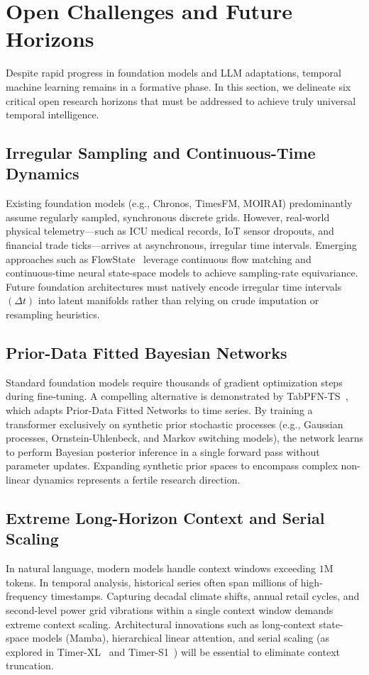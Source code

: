 \section{Open Challenges and Future Horizons}
\label{sec:outlook}

Despite rapid progress in foundation models and LLM adaptations, temporal machine learning remains in a formative phase. In this section, we delineate six critical open research horizons that must be addressed to achieve truly universal temporal intelligence.

\subsection{Irregular Sampling and Continuous-Time Dynamics}
Existing foundation models (e.g., Chronos, TimesFM, MOIRAI) predominantly assume regularly sampled, synchronous discrete grids. However, real-world physical telemetry—such as ICU medical records, IoT sensor dropouts, and financial trade ticks—arrives at asynchronous, irregular time intervals.
Emerging approaches such as FlowState~\cite{king2025flowstate} leverage continuous flow matching and continuous-time neural state-space models to achieve sampling-rate equivariance. Future foundation architectures must natively encode irregular time intervals $(\Delta t)$ into latent manifolds rather than relying on crude imputation or resampling heuristics.

\subsection{Prior-Data Fitted Bayesian Networks}
Standard foundation models require thousands of gradient optimization steps during fine-tuning. A compelling alternative is demonstrated by TabPFN-TS~\cite{muller2025tabpfnts}, which adapts Prior-Data Fitted Networks to time series. By training a transformer exclusively on synthetic prior stochastic processes (e.g., Gaussian processes, Ornstein-Uhlenbeck, and Markov switching models), the network learns to perform Bayesian posterior inference in a single forward pass without parameter updates. Expanding synthetic prior spaces to encompass complex non-linear dynamics represents a fertile research direction.

\subsection{Extreme Long-Horizon Context and Serial Scaling}
In natural language, modern models handle context windows exceeding $1\text{M}$ tokens. In temporal analysis, historical series often span millions of high-frequency timestamps. Capturing decadal climate shifts, annual retail cycles, and second-level power grid vibrations within a single context window demands extreme context scaling. Architectural innovations such as long-context state-space models (Mamba), hierarchical linear attention, and serial scaling (as explored in Timer-XL~\cite{liu2024timerxl} and Timer-S1~\cite{thuml2026timers1}) will be essential to eliminate context truncation.

